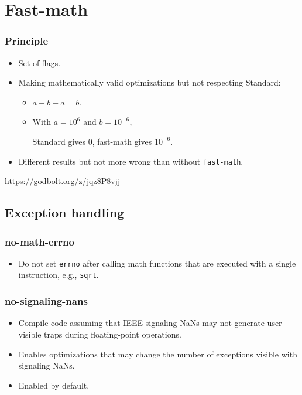 \documentclass{beamer}
\begin{document}
\section{Fast-math}

\begin{frame}
    \tableofcontents[currentsection]
\end{frame}

\begin{frame}[fragile]
    \frametitle{Principle}

    \begin{itemize}
        \item Set of flags.
        \item Making mathematically valid optimizations but not respecting Standard:
              \begin{itemize}
                  \item $a+b-a = b$.
                  \item With $a = 10^6$ and $b = 10^{-6}$,

                        Standard gives $0$, fast-math gives $10^{-6}$.
              \end{itemize}
        \item Different results but not more wrong than without \verb'fast-math'.
    \end{itemize}

    \url{https://godbolt.org/z/jqz8P8vjj}
\end{frame}

\subsection{Exception handling}

\begin{frame}[fragile]
    \frametitle{no-math-errno}

    \begin{itemize}
        \item Do not set \verb'errno' after calling math functions that are executed with a single instruction, e.g., \verb'sqrt'.
    \end{itemize}
\end{frame}

\begin{frame}[fragile]
    \frametitle{no-signaling-nans}

    \begin{itemize}
        \item Compile code assuming that IEEE signaling NaNs may not generate user-visible traps during floating-point operations.
        \item Enables optimizations that may change the number of exceptions visible with signaling NaNs.
        \item Enabled by default.
    \end{itemize}
\end{frame}
\end{document}
